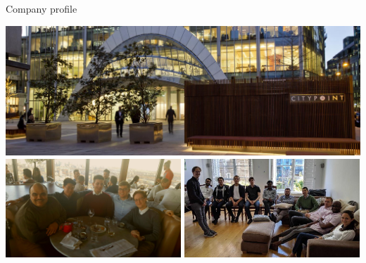 \documentclass[11pt]{beamer}
\begin{document}
\begin{frame}{Company profile}

\pause

\begin{center}

\includegraphics[width=\textwidth]{citypoint.jpg}
\pause
\includegraphics[width=0.494\textwidth]{2016.jpg}
\pause
\includegraphics[width=0.494\textwidth]{2019.jpg}

\end{center}

\end{frame}
\end{document}
